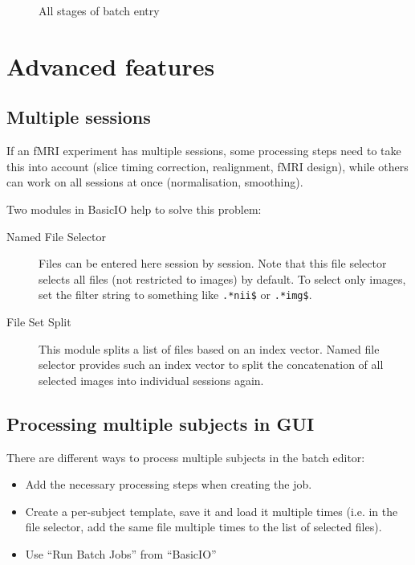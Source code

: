 \begin{figure}[htbp]
  \caption{All stages of batch entry}
  \label{fig:batch_stages}
\end{figure}

\section{Advanced features}
\label{sec:batch_interface_advanced}

\subsection{Multiple sessions}

If an fMRI experiment has multiple sessions, some processing steps need to
take this into account (slice timing correction, realignment, fMRI design),
while others can work on all sessions at once (normalisation, smoothing). 

Two modules in BasicIO help to solve this problem:
\begin{description}
\item[Named File Selector] Files can be entered here session by session. Note
  that this file selector selects all files (not restricted to images) by
  default. To select only images, set the filter string to something like
  \verb|.*nii$| or \verb|.*img$|.
\item[File Set Split] This module splits a list of files based on an index
  vector. Named file selector provides such an index vector to split the
  concatenation of all selected images into individual sessions again.
\end{description}

\subsection{Processing multiple subjects in GUI}

There are different ways to process multiple subjects in the batch
editor:
\begin{itemize}
\item Add the necessary processing steps when creating the job.
\item Create a per-subject template, save it and load it multiple
  times (i.e. in the file selector, add the same file multiple times
  to the list of selected files).
\item Use ``Run Batch Jobs'' from ``BasicIO''
\end{itemize}

